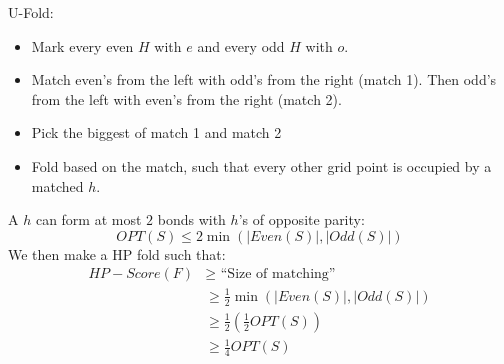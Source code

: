     U-Fold: 
    \begin{itemize}
        \item Mark every even $H$ with $e$ and every odd $H$ with $o$.
        \item Match even's from the left with odd's from the right (match 1). 
        Then odd's from the left with even's from the right (match 2). 
        \item Pick the biggest of match 1 and match 2
        \item Fold based on the match, such that every other grid point is 
        occupied by a matched $h$.
    \end{itemize}
    A $h$ can form at most $2$ bonds with $h$'s of opposite parity:
    \begin{equation*}
        OPT(S)\leq 2 \min(|Even(S)|,|Odd(S)|)
    \end{equation*}
    We then make a HP fold such that:
    \begin{align*}
        HP-Score(F) &\geq\text{ ``Size of matching''}\\
            &\geq \frac{1}{2}\min(|Even(S)|,|Odd(S)|)\\
            &\geq \frac{1}{2}(\frac{1}{2} OPT(S))\\
            &\geq \frac{1}{4} OPT(S)
    \end{align*}
